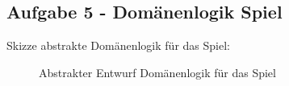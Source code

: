 \documentclass[11pt,ngerman]{article}
\begin{document}
    \newpage
    \subsection{Aufgabe 5 - Domänenlogik Spiel}
    \label{ssec:Aufg4}
    Skizze abstrakte Domänenlogik für das Spiel:

    \begin{figure}[H]
        \centering
        \caption{Abstrakter Entwurf Domänenlogik für das Spiel}
        \label{fig:KD_Aufg4}
    \end{figure}
\end{document}
